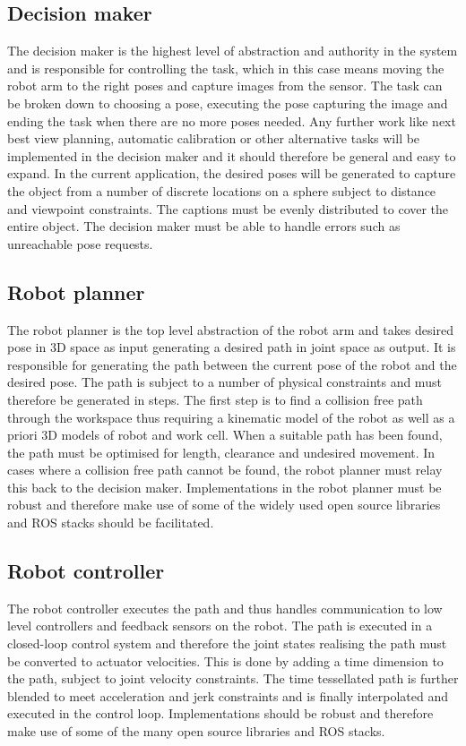 \subsection{Decision maker}
The decision maker is the highest level of abstraction and authority in the system and is responsible for controlling the task, which in this case means moving the robot arm to the right poses and capture images from the sensor. The task can be broken down to choosing a pose, executing the pose capturing the image and ending the task when there are no more poses needed. Any further work like next best view planning, automatic calibration or other alternative tasks will be implemented in the decision maker and it should therefore be general and easy to expand. In the current application, the desired poses will be generated to capture the object from a number of discrete locations on a sphere subject to distance and viewpoint constraints. The captions must be evenly distributed to cover the entire object. The decision maker must be able to handle errors such as unreachable pose requests.

\subsection{Robot planner}
The robot planner is the top level abstraction of the robot arm and takes desired pose in 3D space as input generating a desired path in joint space as output. It is responsible for generating the path between the current pose of the robot and the desired pose. The path is subject to a number of physical constraints and must therefore be generated in steps. The first step is to find a collision free path through the workspace thus requiring a kinematic model of the robot as well as a priori 3D models of robot and work cell. When a suitable path has been found, the path must be optimised for length, clearance and undesired movement. In cases where a collision free path cannot be found, the robot planner must relay this back to the decision maker. Implementations in the robot planner must be robust and therefore make use of some of the widely used open source libraries and ROS stacks should be facilitated. 

\subsection{Robot controller}
The robot controller executes the path and thus handles communication to low level controllers and feedback sensors on the robot. The path is executed in a closed-loop control system and therefore the joint states realising the path must be converted to actuator velocities. This is done by adding a time dimension to the path, subject to joint velocity constraints. The time tessellated path is further blended to meet acceleration and jerk constraints and is finally interpolated and executed in the control loop. Implementations should be robust and therefore make use of some of the many open source libraries and ROS stacks. 


